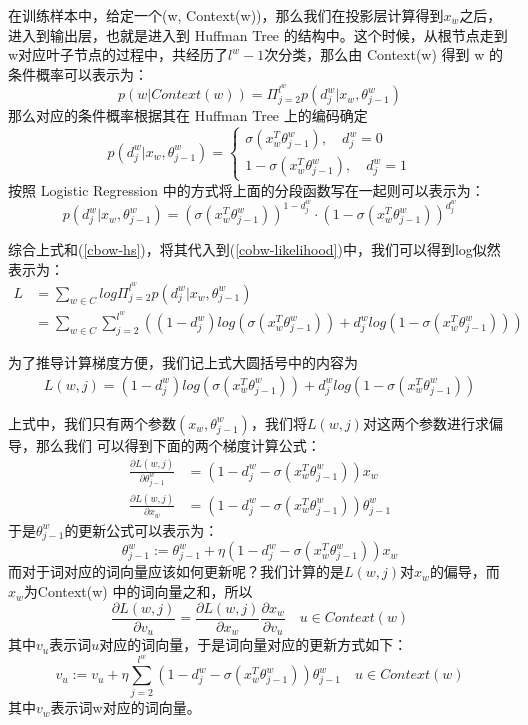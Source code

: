\documentclass[UTF8]{ctexart}
\begin{document}
\par
在训练样本中，给定一个(w, Context(w))，那么我们在投影层计算得到$x_w$之后，进入到输出层，也就是进入到
Huffman Tree 的结构中。这个时候，从根节点走到w对应叶子节点的过程中，共经历了$l^w-1$次分类，那么由
Context(w) 得到 w 的条件概率可以表示为：
\begin{equation}
\label{cbow-hs}
p(w|Context(w)) = \Pi_{j=2}^{l^w} p(d_j^w|x_w, \theta_{j-1}^w)
\end{equation}
那么对应的条件概率根据其在 Huffman Tree 上的编码确定
\begin{equation}
p(d_j^w|x_w, \theta_{j-1}^w)= \begin{cases}
\sigma(x_w^T \theta_{j-1}^w), \quad d_j^w=0
\\
1 - \sigma(x_w^T \theta_{j-1}^w), \quad d_j^w=1
\end{cases}
\end{equation}
按照 Logistic Regression 中的方式将上面的分段函数写在一起则可以表示为：
\[ p(d_j^w|x_w, \theta_{j-1}^w) = (\sigma(x_w^T \theta_{j-1}^w))^{1-d_j^w} %
\cdot (1-\sigma(x_w^T\theta_{j-1}^w))^{d_j^w} \]
\par
综合上式和(\ref{cbow-hs})，将其代入到(\ref{cobw-likelihood})中，我们可以得到log似然表示为：
\begin{align}
L &= \sum_{w \in C} log \Pi_{j=2}^{l^w}p(d_j^w|x_w, \theta_{j-1}^w)
\\
&= \sum_{w \in C} \sum_{j=2}^{l^w} \left( (1-d_j^w)log(\sigma(x_w^T \theta_{j-1}^w)) %
+ d_j^w log(1-\sigma(x_w^T\theta_{j-1}^w)) \right)
\end{align}
\par
为了推导计算梯度方便，我们记上式大圆括号中的内容为
\begin{align}
L(w, j) = (1-d_j^w)log(\sigma(x_w^T \theta_{j-1}^w)) + d_j^w log(1-\sigma(x_w^T\theta_{j-1}^w))
\end{align}
\par
上式中，我们只有两个参数$(x_w, \theta_{j-1}^w)$，我们将$L(w, j)$对这两个参数进行求偏导，那么我们
可以得到下面的两个梯度计算公式：
\begin{align}
\frac{\partial L(w, j)}{\partial \theta_{j-1}^w} &= %
(1 - d_j^w - \sigma(x_w^T \theta_{j-1}^w))x_w
\\
\frac{\partial L(w, j)}{\partial x_w} &= %
(1 - d_j^w - \sigma(x_w^T \theta_{j-1}^w))\theta_{j-1}^w
\end{align}
于是$\theta_{j-1}^w$的更新公式可以表示为：
\[ \theta_{j-1}^w := \theta_{j-1}^w + \eta (1 - d_j^w - \sigma(x_w^T \theta_{j-1}^w))x_w \]
而对于词对应的词向量应该如何更新呢？我们计算的是$L(w, j)$对$x_w$的偏导，而$x_w$为Context(w)
中的词向量之和，所以\[ \frac{\partial L(w,j)}{\partial v_u} = %
\frac{\partial L(w,j)}{\partial x_w} \frac{\partial x_w}{\partial v_u} \quad u \in Context(w)\]
其中$v_u$表示词$u$对应的词向量，于是词向量对应的更新方式如下：
\[ v_u := v_u + \eta \sum_{j=2}^{l^w} (1 - d_j^w - \sigma(x_w^T \theta_{j-1}^w))\theta_{j-1}^w %
\quad u \in Context(w) \]
其中$v_w$表示词w对应的词向量。
\end{document}
